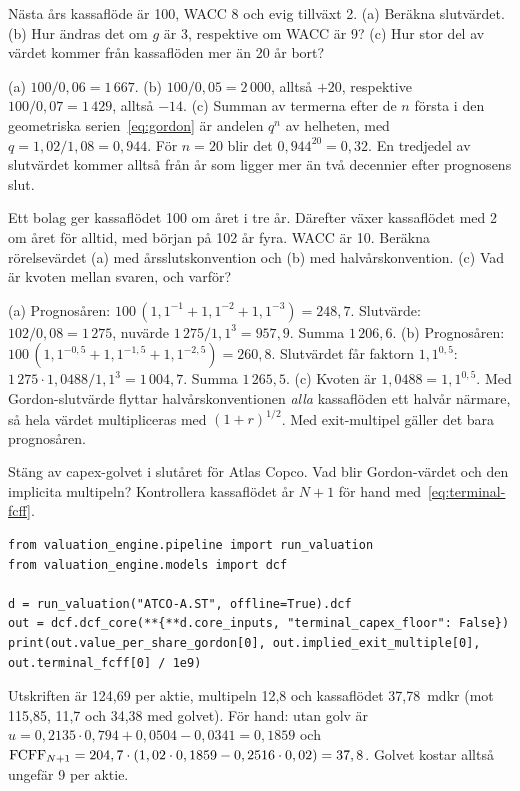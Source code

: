 \begin{ovning}
Nästa års kassaflöde är 100, WACC 8\pct{} och evig tillväxt 2\pct. (a) Beräkna slutvärdet. (b)
Hur ändras det om $g$ är 3\pct, respektive om WACC är 9\pct? (c) Hur stor del av värdet kommer
från kassaflöden mer än 20 år bort?
\end{ovning}
\begin{losning}
(a) $100 / 0,06 = 1\,667$. (b) $100 / 0,05 = 2\,000$, alltså $+20$\pct, respektive
$100 / 0,07 = 1\,429$, alltså $-14$\pct. (c) Summan av termerna efter de $n$ första i den
geometriska serien~\eqref{eq:gordon} är andelen $q^n$ av helheten, med
$q = 1,02 / 1,08 = 0,944$. För $n = 20$ blir det $0,944^{20} = 0,32$. En tredjedel av
slutvärdet kommer alltså från år som ligger mer än två decennier efter prognosens slut.
\end{losning}

\begin{ovning}
Ett bolag ger kassaflödet 100 om året i tre år. Därefter växer kassaflödet med 2\pct{} om året
för alltid, med början på 102 år fyra. WACC är 10\pct. Beräkna rörelsevärdet (a) med
årsslutskonvention och (b) med halvårskonvention. (c) Vad är kvoten mellan svaren, och varför?
\end{ovning}
\begin{losning}
(a) Prognosåren: $100\,(1,1^{-1} + 1,1^{-2} + 1,1^{-3}) = 248,7$. Slutvärde:
$102 / 0,08 = 1\,275$, nuvärde $1\,275 / 1,1^3 = 957,9$. Summa $1\,206,6$. (b) Prognosåren:
$100\,(1,1^{-0,5} + 1,1^{-1,5} + 1,1^{-2,5}) = 260,8$. Slutvärdet får faktorn $1,1^{0,5}$:
$1\,275 \cdot 1,0488 / 1,1^3 = 1\,004,7$. Summa $1\,265,5$. (c) Kvoten är $1,0488 = 1,1^{0,5}$.
Med Gordon-slutvärde flyttar halvårskonventionen \emph{alla} kassaflöden ett halvår närmare,
så hela värdet multipliceras med $(1+r)^{1/2}$. Med exit-multipel gäller det bara prognosåren.
\end{losning}

\begin{ovning}
Stäng av capex-golvet i slutåret för Atlas Copco. Vad blir Gordon-värdet och den implicita
multipeln? Kontrollera kassaflödet år $N+1$ för hand med~\eqref{eq:terminal-fcff}.
\begin{lstlisting}
from valuation_engine.pipeline import run_valuation
from valuation_engine.models import dcf

d = run_valuation("ATCO-A.ST", offline=True).dcf
out = dcf.dcf_core(**{**d.core_inputs, "terminal_capex_floor": False})
print(out.value_per_share_gordon[0], out.implied_exit_multiple[0], out.terminal_fcff[0] / 1e9)
\end{lstlisting}
\end{ovning}
\begin{losning}
Utskriften är 124,69\kr{} per aktie, multipeln 12,8 och kassaflödet 37,78~mdkr (mot 115,85,
11,7 och 34,38 med golvet). För hand: utan golv är
$u = 0,2135 \cdot 0,794 + 0,0504 - 0,0341 = 0,1859$ och
$\mathrm{FCFF}_{N+1} = 204,7 \cdot (1,02 \cdot 0,1859 - 0,2516 \cdot 0,02) = 37,8$. Golvet kostar
alltså ungefär 9\kr{} per aktie.
\end{losning}

